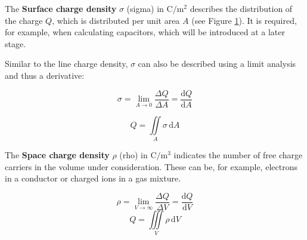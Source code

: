 \begin{frame}
{	The \textbf{Surface charge density} $\sigma$ (sigma) in $\mathrm{C/m^2}$ describes the distribution of the charge $Q$,
    which is distributed per unit area $A$ (see Figure \ref{fig:flächenladung}). 
    It is required, for example, when calculating capacitors, which will be introduced at a later stage.

	\begin{figure}[h!]
		\renewcommand{\figurename}{Figure}
		\centering
	
		\s{}
		\label{fig:flächenladung}
	\end{figure}


	

	Similar to the line charge density, $\sigma$ can also be described using a limit analysis and thus a derivative:


	\begin{equation*}
		\sigma = \lim \limits_{A \to 0} \frac{\Delta Q}{\Delta A} = \frac{\mathrm{d}Q}{\mathrm{d}A}
	\end{equation*}

	\begin{equation*}
		Q = \iint\limits_A \sigma \, \mathrm{d}A
	\end{equation*}

	The \textbf{Space charge density} $\rho$ (rho) in $\mathrm{C/m^3}$ indicates the number of free charge carriers in the volume under consideration.
	These can be, for example, electrons in a conductor or charged ions in a gas mixture.
	

	\begin{figure}[h!]
		\renewcommand{\figurename}{Figure}
		\centering
	
		\s{}
		\label{fig:raumladung}
	\end{figure}
	
	

	\begin{equation*}
		\rho = \lim \limits_{V \to \infty} \frac{\Delta Q}{\Delta V} = \frac{\mathrm{d}Q}{\mathrm{d}V}
	\end{equation*}
	\begin{equation*}
		Q = \iiint\limits_V \rho \, \mathrm{d}V
	\end{equation*}	

}
\end{frame}
